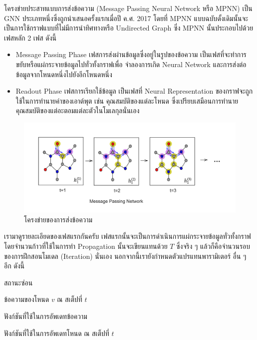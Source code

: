โครงข่ายประสาทแบบการส่งข้อความ (Message Passing Neural Network หรือ MPNN) เป็น GNN ประเภทหนึ่งซึ่งถูกนำเสนอครั้งแรกเมื่อปี 
ค.ศ. 2017\autocite{gilmer2017} โดยที่ MPNN แบบฉบับดั้งเดิมนั้นจะเป็นการใช้กราฟแบบที่ไม่มีการนำทิศทางหรือ Undirected Graph
ซึ่ง MPNN นั้นประกอบไปด้วยเฟสหลัก 2 เฟส ดังนี้ 

\begin{itemize}
    \item Message Passing Phase เฟสการส่งผ่านข้อมูลซึ่งอยู่ในรูปของข้อความ เป็นเฟสที่จะทำการขยับหรือแผ่กระจายข้อมูลไปทั่วทั้งกราฟเพื่อ%
    จำลองการเกิด Neural Network และการส่งต่อข้อมูลจากโหนดหนึ่งไปยังอีกโหนดหนึ่ง
    
    \item Readout Phase เฟสการเรียกใช้ข้อมูล เป็นเฟสที่ Neural Representation ของกราฟจะถูกใช้ในการทำนายค่าของเอาต์พุต เช่น
    คุณสมบัติของแต่ละโหนด ซึ่งเปรียบเสมือนการทำนายคุณสมบัติของแต่อะตอมแต่ละตัวในโมเลกุลนั่นเอง
\end{itemize}

\begin{figure}[htbp]
    \centering
    \includegraphics[width=\linewidth]{fig/mp-network.png}
    \caption{โครงข่ายของการส่งข้อความ}
    \label{fig:mp_network}
\end{figure}

เรามาดูรายละเอียดของเฟสแรกกันครับ เฟสแรกนั้นจะเป็นการดำเนินการแผ่กระจายข้อมูลทั่วทั้งกราฟ โดยจำนวนก้าวที่ใช้ในการทำ Propagation 
นั้นจะเขียนแทนด้วย $T$ ซึ่งจริง ๆ แล้วก็คือจำนวนรอบของการฝึกสอนโมเดล (Iteration) นั่นเอง นอกจากนี้เรายังกำหนดตัวแปรแทนพารามิเตอร์%
อื่น ๆ อีก ดังนี้

\begin{description}[font=$\bullet$,labelindent=2em,labelwidth=2cm,labelsep=0em]
    \item[\ $h$] สถานะซ่อน
    
    \item[\ $m^{t}_{v}$] ข้อความของโหนด $v$ ณ สเต็ปที่ $t$
    
    \item[\ $M$] ฟังก์ชันที่ใช้ในการอัพเดทข้อความ
    
    \item[\ $U_{t}$] ฟังก์ชันที่ใช้ในการอัพเดทโหนด ณ สเต็ปที่ $t$    
\end{description}

